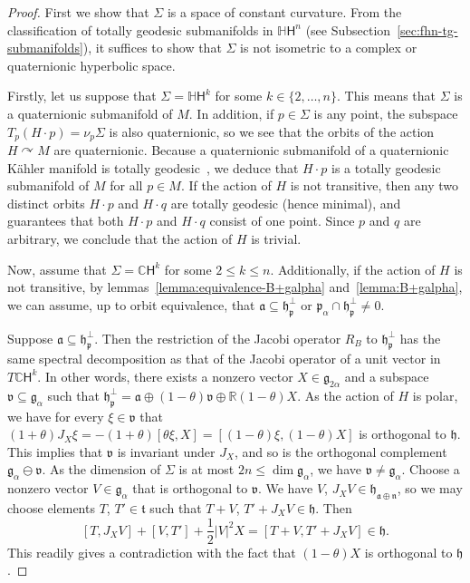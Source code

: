 \documentclass[12pt, a4paper]{amsart}
\newcommand{\g}{\mathfrak}
\newcommand{\s}{\mathsf}
\newcommand{\R}{\mathbb{R}}
\newcommand{\C}{\mathbb{C}}
\renewcommand{\H}{\mathbb{H}}
\theoremstyle{definition}
\begin{document}
\begin{proof}
First we show that $\Sigma$ is a space of constant curvature.
From the classification of totally geodesic submanifolds in $\H\s{H}^n$ 
(see Subsection~\ref{sec:fhn-tg-submanifolds}), 
it suffices to show that $\Sigma$ is not isometric to a complex or quaternionic hyperbolic space.

Firstly, let us suppose that $\Sigma = \H\s{H}^k$ for some $k\in \{ 2,\dots,n \}$.
This means that $\Sigma$ is a quaternionic submanifold of $M$.
In addition, if $p\in \Sigma$ is any point, the subspace $T_p(H\cdot p)=\nu_p\Sigma$ is also quaternionic, 
so we see that the orbits of the action $H\curvearrowright M$ are quaternionic.
Because a quaternionic submanifold of a quaternionic Kähler manifold is totally geodesic~\cite[Theorem~5]{Gray}, we deduce that $H\cdot p$ is a totally geodesic submanifold of $M$ for all $p\in M$.
If the action of $H$ is not transitive, 
then any two distinct orbits $H\cdot p$ and $H\cdot q$ are totally geodesic (hence minimal), and~\cite[Corollary~5.2]{AlekseevskyDiScala} 
guarantees that both $H\cdot p$ and $H\cdot q$ consist of one point.
Since $p$ and $q$ are arbitrary, we conclude that the action of $H$ is trivial.

Now, assume that $\Sigma = \C\s{H}^k$ for some $2\leq k \leq n$.
Additionally, if the action of $H$ is not transitive, by lemmas~\ref{lemma:equivalence-B+galpha} and~\ref{lemma:B+galpha}, 
we can assume, up to orbit equivalence, 
that $\g{a}\subseteq\g{h}_\g{p}^\perp$ or $\g{p}_\alpha\cap\g{h}_\g{p}^\perp\neq 0$.

Suppose $\g{a}\subseteq \g{h}_{\g{p}}^\perp$.
Then the restriction of the Jacobi operator $R_{B}$ to $\g{h}_{\g{p}}^\perp$ has the same spectral decomposition as that of the Jacobi operator of a unit vector in $T\C\s{H}^k$.
In other words, there exists a nonzero vector $X\in\g{g}_{2\alpha}$ and a subspace $\g{v}\subseteq \g{g}_\alpha$ such that $\g{h}_{\g{p}}^\perp=\g{a}\oplus (1-\theta)\g{v}\oplus \R (1-\theta)X$.
As the action of $H$ is polar, 
we have for every $\xi\in \g{v}$ that 
$(1+\theta)J_X\xi =-(1+\theta)[\theta\xi,X]=[(1-\theta)\xi,(1-\theta)X]$ is orthogonal to $\g{h}$.
This implies that $\g{v}$ is invariant under $J_X$, 
and so is the orthogonal complement $\g{g}_\alpha\ominus \g{v}$.
As the dimension of $\Sigma$ is at most $2n\leq\dim \g{g}_\alpha$, we have $\g{v}\neq \g{g}_\alpha$.
Choose a nonzero vector $V \in \g{g}_\alpha$ that is orthogonal to $\g{v}$.
We have $V$, $J_X V\in \g{h}_{\g{a}\oplus\g{n}}$, 
so we may choose elements $T$, $T'\in\g{t}$ such that $T+V$, $T'+J_X V\in \g{h}$.
Then
\[
[T,J_X V]+[V,T']+\frac{1}{2}\lvert V \rvert^2 X=[T+V,T'+J_X V]\in\g{h}.
\]
This readily gives a contradiction with the fact that $(1-\theta)X$ is orthogonal to $\g{h}$.


\end{proof}
\end{document}
